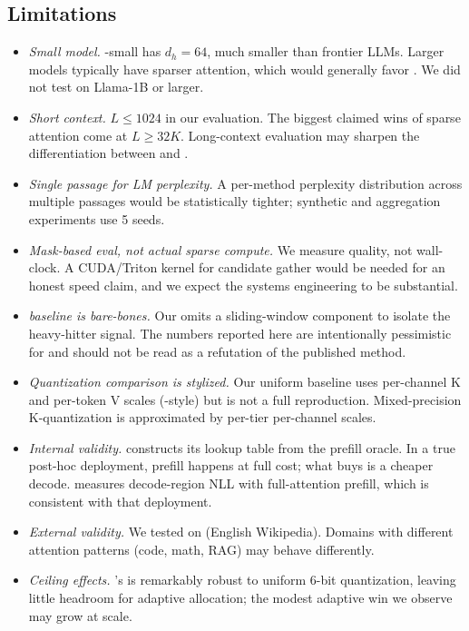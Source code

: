 \subsection{Limitations}

\begin{itemize}[leftmargin=*,itemsep=0pt,topsep=0pt]
    \item \emph{Small model.} \gpttwo-small has $d_h = 64$, much smaller than frontier LLMs. Larger models typically have sparser attention, which would generally favor \hma. We did not test on Llama-1B or larger.
    \item \emph{Short context.} $L \leq 1024$ in our evaluation. The biggest claimed wins of sparse attention come at $L \geq 32K$. Long-context evaluation may sharpen the differentiation between \hma and \streaming.
    \item \emph{Single passage for LM perplexity.} A per-method perplexity distribution across multiple passages would be statistically tighter; synthetic and aggregation experiments use 5 seeds.
    \item \emph{Mask-based eval, not actual sparse compute.} We measure quality, not wall-clock. A CUDA/Triton kernel for \hma candidate gather would be needed for an honest speed claim, and we expect the systems engineering to be substantial.
    \item \emph{\hto baseline is bare-bones.} Our \hto omits a sliding-window component to isolate the heavy-hitter signal. The numbers reported here are intentionally pessimistic for \hto and should not be read as a refutation of the published method.
    \item \emph{Quantization comparison is stylized.} Our uniform baseline uses per-channel K and per-token V scales (\kivi-style) but is not a full \kivi reproduction. Mixed-precision K-quantization is approximated by per-tier per-channel scales.
\end{itemize}

\begin{itemize}[leftmargin=*,itemsep=0pt,topsep=0pt]
    \item \emph{Internal validity.} \hma constructs its lookup table from the prefill oracle. In a true post-hoc deployment, prefill happens at full cost; what \hma buys is a cheaper decode.  measures decode-region NLL with full-attention prefill, which is consistent with that deployment.
    \item \emph{External validity.} We tested on \wikitext (English Wikipedia). Domains with different attention patterns (code, math, RAG) may behave differently.
    \item \emph{Ceiling effects.} \gpttwo's \kvcache is remarkably robust to uniform 6-bit quantization, leaving little headroom for adaptive allocation; the modest adaptive win we observe may grow at scale.
\end{itemize}


